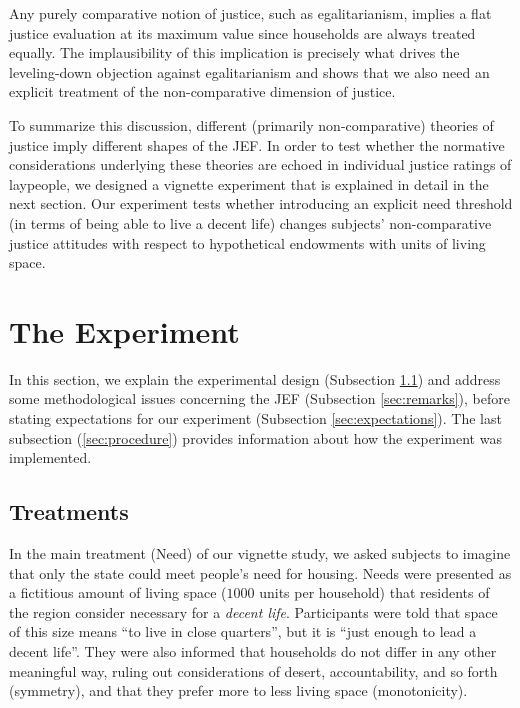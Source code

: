 \documentclass[12pt]{scrartcl}
\begin{document}
Any purely comparative notion of justice, such as egalitarianism, implies a flat justice evaluation at its maximum value since households are always treated equally.
The implausibility of this implication is precisely what drives the leveling-down objection \citep{nozick_anarchy_1974,raz_morality_1986,temkin_inequality_1993} against egalitarianism and shows that we also need an explicit treatment of the non-comparative dimension of justice.

To summarize this discussion, different (primarily non-comparative) theories of justice imply different shapes of the JEF.
In order to test whether the normative considerations underlying these theories are echoed in individual justice ratings of laypeople, we designed a vignette experiment that is explained in detail in the next section.
Our experiment tests whether introducing an explicit need threshold (in terms of being able to live a decent life) changes subjects' non-comparative justice attitudes with respect to hypothetical endowments with units of living space.


\section{The Experiment}\label{sec:experiment}
In this section, we explain the experimental design (Subsection \ref{sec:treatments}) and address some methodological issues concerning the JEF (Subsection \ref{sec:remarks}), before stating expectations for our experiment (Subsection \ref{sec:expectations}).
The last subsection (\ref{sec:procedure}) provides information about how the experiment was implemented.


\subsection{Treatments}\label{sec:treatments}
In the main treatment (Need) of our vignette study, we asked subjects to imagine that only the state could meet people's need for housing.
Needs were presented as a fictitious amount of living space ($1000$ units per household) that residents of the region consider necessary for a \textit{decent life}.
Participants were told that space of this size means ``to live in close quarters'', but it is ``just enough to lead a decent life''.
They were also informed that households do not differ in any other meaningful way, ruling out considerations of desert, accountability, and so forth (symmetry), and that they prefer more to less living space (monotonicity).
\end{document}

